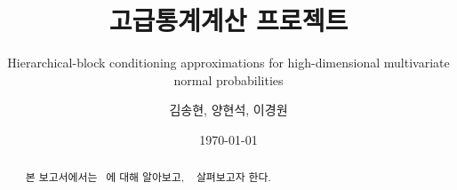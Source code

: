 \documentclass{scrartcl}
\begin{document}
\title{고급통계계산 프로젝트}
\subtitle{Hierarchical-block conditioning approximations for high-dimensional multivariate normal probabilities}
\author{김송현, 양현석, 이경원}
\date{\today}
\maketitle


\begin{abstract}
    본 보고서에서는 ~에 대해 알아보고, ~ 살펴보고자 한다. 
\end{abstract}









\end{document}
